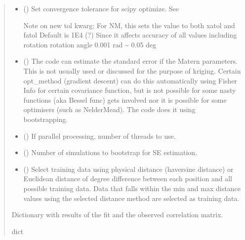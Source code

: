 \documentclass[letterpaper,10pt,english]{sphinxmanual}
\begin{document}
\begin{fulllineitems}
\begin{fulllineitems}
\begin{quote}
\begin{description}
\begin{itemize}
\item {}
\sphinxAtStartPar
{} () \textendash{}
\sphinxAtStartPar
Set convergence tolerance for scipy optimize.
See 

\sphinxAtStartPar
Note on new tol kwarg:
For N\sphinxhyphen{}M, this sets the value to both xatol and fatol
Default is 1E\sphinxhyphen{}4 (?)
Since it affects accuracy of all values including rotation
rotation angle 0.001 rad \textasciitilde{} 0.05 deg


\item {}
\sphinxAtStartPar
{} (\sphinxstyleliteralemphasis{\sphinxupquote{ | }}) \textendash{} The code can estimate the standard error if the Matern parameters.
This is not usually used or discussed for the purpose of kriging.
Certain opt\_method (gradient descent) can do this automatically
using Fisher Info for certain covariance function,
but is not possible for some nasty functions (aka Bessel
func) gets involved nor it is possible for some optimisers
(such as Nelder\sphinxhyphen{}Mead).
The code does it using bootstrapping.

\item {}
\sphinxAtStartPar
{} () \textendash{} If parallel processing, number of threads to use.

\item {}
\sphinxAtStartPar
{} () \textendash{} Number of simulations to bootstrap for SE estimation.

\item {}
\sphinxAtStartPar
{} () \textendash{} Select training data using physical distance (haversine distance) or
Euclidean distance of degree difference between each position and
all possible training data. Data that falls within the min and max
distance values using the selected distance method are selected as
training data.

\end{itemize}

\sphinxAtStartPar
Dictionary with results of the fit and the observed correlation
matrix.

\sphinxAtStartPar
dict

\end{description}\end{quote}

\end{fulllineitems}


\end{fulllineitems}
\end{document}
